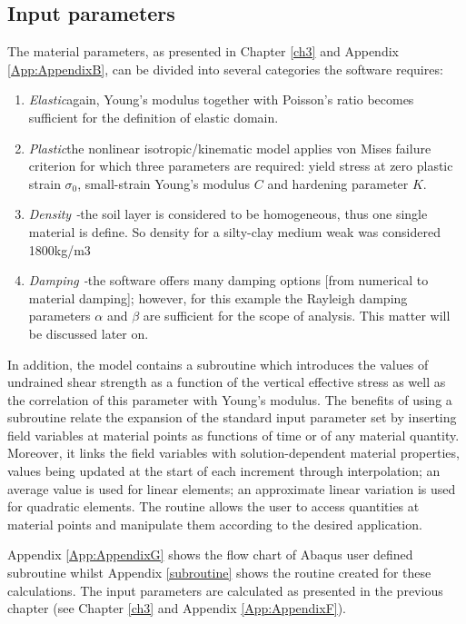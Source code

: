 	\subsection{Input parameters}
	The material parameters, as presented in Chapter \ref{ch3} and Appendix \ref{App:AppendixB}, can be divided into several categories the software requires:
	\begin{enumerate}
		\item \textit{Elastic}\quad again, Young's modulus together with Poisson's ratio becomes sufficient for the definition of elastic domain.
		\item \textit{Plastic}\quad the nonlinear isotropic/kinematic model applies von Mises failure criterion for which three parameters are required: yield stress at zero plastic strain $\sigma_0$, small-strain Young's modulus $C$ and hardening parameter $K$.
		\item\textit{Density -}\quad the soil layer is considered to be homogeneous, thus one single material is define. So density for a silty-clay medium weak was considered 1800kg/m3
		\item \textit{Damping -}\quad the software offers many damping options [from numerical to material damping]; however, for this example the Rayleigh damping parameters $\alpha$ and $\beta$ are sufficient for the scope of analysis. This matter will be discussed later on.
	\end{enumerate}
	
	In addition, the model contains a subroutine which introduces the values of undrained shear strength as a function of the vertical effective stress as well as the correlation of this parameter with Young's modulus. The benefits of using a subroutine relate the expansion of the standard input parameter set by inserting field variables at material points as functions of time or of any material quantity. Moreover, it links the field variables with solution-dependent material properties, values being updated at the start of each increment through interpolation; an average value is used for linear elements; an approximate linear variation is used for quadratic elements. The routine allows the user to access quantities at material points and manipulate them according to the desired application. 
	
	Appendix \ref{App:AppendixG} shows the flow chart of Abaqus user defined subroutine whilst Appendix \ref{subroutine} shows the routine created for these calculations. The input parameters are calculated as presented in the previous chapter (see Chapter \ref{ch3} and Appendix \ref{App:AppendixF}).  
	
